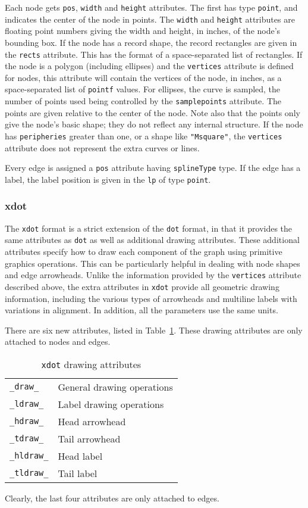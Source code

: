Each node gets {\tt pos}, {\tt width} and {\tt height} attributes. 
The first has type {\tt point}, and indicates the center of the node
in points. The
{\tt width} and {\tt height} attributes are floating point numbers
giving the width and height, in inches, of the node's bounding box.
If the node has a record shape, the record rectangles are given in the 
{\tt rects} attribute. This has the format of a space-separated list
of rectangles. 
If the node is a polygon (including ellipses) and the {\tt vertices}
attribute is defined for nodes, this attribute will contain the 
vertices of the node, in inches, as a space-separated list of {\tt pointf}
values.
For ellipses, the curve is sampled, the number of points used being
controlled by the {\tt samplepoints} attribute.
The points are given relative to the center of the node.
Note also that the points only give the node's basic shape; they do
not reflect any internal structure. If the node has
{\tt peripheries} greater than one, 
or a shape like {\tt "Msquare"}, the {\tt vertices}
attribute does not represent the extra curves or lines.

Every edge is assigned a {\tt pos} attribute having {\tt splineType}
type. If the edge has a label, the label position is given in the
{\tt lp} of type {\tt point}. 

\subsubsection{xdot}
\label{sect:xdot}

The {\tt xdot} format is a strict extension of the {\tt dot} format, in that it
provides the same attributes as {\tt dot} as well as additional drawing
attributes. These additional attributes specify how to draw each component of 
the graph using primitive graphics operations. This can be particularly
helpful in dealing with node shapes and edge arrowheads.
Unlike the information provided by the {\tt vertices} attribute
described above, 
the extra attributes in {\tt xdot} provide all geometric drawing information,
including the various types of arrowheads and multiline labels with
variations in alignment. In addition, all the parameters use the same
units.

There are six new attributes, listed in Table~\ref{table:xdot}.
These drawing attributes are only attached to nodes and edges. 
\begin{table}[htb]
\centering
\begin{tabular}[t]{|ll|} \hline
{\tt \_draw\_} & General drawing operations \\
{\tt \_ldraw\_} & Label drawing operations \\
{\tt \_hdraw\_} & Head arrowhead \\
{\tt \_tdraw\_} & Tail arrowhead \\
{\tt \_hldraw\_} & Head label \\
{\tt \_tldraw\_} & Tail label \\
\hline
\end{tabular}
\caption{{\tt xdot} drawing attributes}
\label{table:xdot}
\end{table}
Clearly, the last four attributes are only attached to edges.

